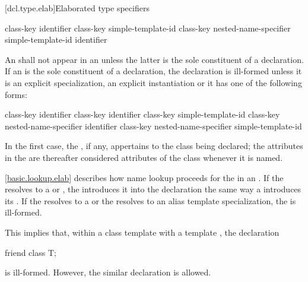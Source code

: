 [dcl.type.elab]{Elaborated type specifiers}%
%
%

\begin{bnf}
\br
    class-key   identifier\br
    class-key simple-template-id\br
    class-key nested-name-specifier  simple-template-id\br
      identifier
\end{bnf}

\pnum
{}%
%
An  shall not appear in an 
unless the latter is the sole constituent of a declaration.
If an  is the sole constituent of a
declaration, the declaration is ill-formed unless it is an explicit
specialization, an explicit
instantiation or it has one of the following
forms:

\begin{ncsimplebnf}
class-key  identifier \terminal{;}\br
{} class-key \terminal{\opt{::}} identifier \terminal{;}\br
{} class-key \terminal{\opt{::}} simple-template-id \terminal{;}\br
{} class-key nested-name-specifier identifier \terminal{;}\br
{} class-key nested-name-specifier  simple-template-id \terminal{;}
\end{ncsimplebnf}

In the first case, the , if any, appertains
to the class being declared; the attributes in the
 are thereafter considered attributes of
the class whenever it is named.

\pnum
\ref{basic.lookup.elab} describes how name lookup proceeds for the
 in an . If the
 resolves to a  or
, the 
introduces it into the declaration the same way a
 introduces its . If
the  resolves to a
 or the  resolves to
an alias template specialization,
the
 is ill-formed.
\begin{note}
This implies that, within a class template with a template
 , the declaration

\begin{codeblock}
friend class T;
\end{codeblock}

is ill-formed. However, the similar declaration  is allowed.
\end{note}

